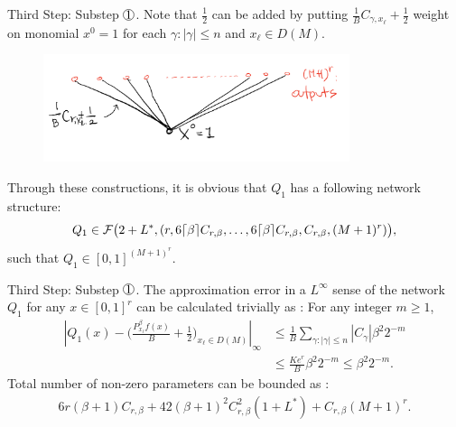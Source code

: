 \documentclass{if-beamer}
\DeclarePairedDelimiter{\ceil}{\lceil}{\rceil}
\newcommand*\circled[1]{\tikz[baseline=(char.base)]{
            \node[shape=circle,draw,inner sep=0.2pt] (char) {#1};}}
\begin{document}
\begin{frame}{Third Step: Substep $\circled{1}$.}
Note that $\frac{1}{2}$ can be added by putting $\frac{1}{B}C_{\gamma,x_{\ell}}+\frac{1}{2}$ weight on monomial $x^{0}=1$ for each $\gamma:|\gamma|\leq n$ and $x_{\ell}\in D(M)$.
\begin{figure}[htbp]
    \includegraphics[width=0.8\textwidth]{one-half.png}
    \label{fig:figure9}
\end{figure}

Through these constructions, it is obvious that $Q_{1}$ has a following network structure:
\begin{equation*}
    Q_{1}\in \mathcal{F}\big(2+L^*,
            (r,6\ceil{\beta}C_{r,\beta},\dots,6\ceil{\beta}C_{r,\beta},C_{r,\beta},(M+1)^{r})\big),
\end{equation*}
such that $Q_{1}\in[0,1]^{(M+1)^{r}}$.
\end{frame}

\begin{frame}{Third Step: Substep $\circled{1}$.}
The approximation error in a $L^{\infty}$ sense of the network $Q_{1}$ for any $x\in[0,1]^{r}$ can be calculated trivially as : For any integer $m\geq 1$,
\begin{align*}
\left|Q_{1}(x)-\bigg( \frac{P^{\beta}_{x_{\ell}}f(x)}{B} + \frac{1}{2} \bigg)_{x_{\ell}\in D(M)} \right|_{\infty}
&\leq \frac{1}{B}\sum_{\gamma:|\gamma|\leq n}|C_{\gamma}|\beta^{2}2^{-m}\\
&\leq \frac{Ke^{r}}{B}\beta^{2}2^{-m}\leq \beta^{2}2^{-m}. 
\end{align*}
Total number of non-zero parameters can be bounded as :
\begin{align*}
6r(\beta+1)C_{r,\beta}+42(\beta+1)^{2}C_{r,\beta}^{2}(1+L^*)+C_{r,\beta}(M+1)^{r}.
\end{align*}
\end{frame}
\end{document}
